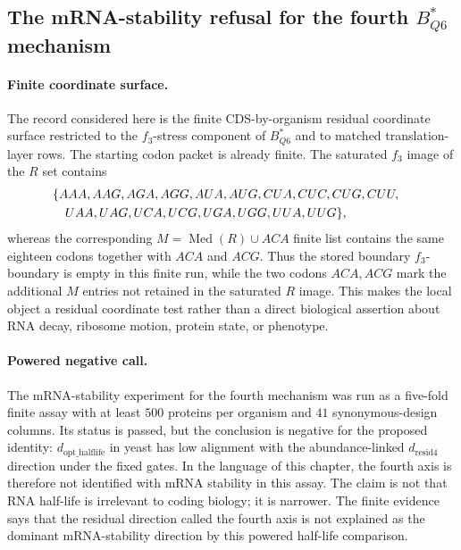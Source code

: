 
\subsection{The mRNA-stability refusal for the fourth $B^{\ast}_{Q6}$ mechanism}
\label{sec:bioreality-q6-fourth-mechanism-mrna-stability-refusal}

\paragraph{Finite coordinate surface.}
The record considered here is the finite CDS-by-organism residual coordinate surface restricted to the $f_3$-stress component of $B^{\ast}_{Q6}$ and to matched translation-layer rows.  The starting codon packet is already finite.  The saturated $f_3$ image of the $R$ set contains
$$
\begin{aligned}
&\{AAA,AAG,AGA,AGG,AUA,AUG,CUA,CUC,CUG,CUU,\cr
&\quad UAA,UAG,UCA,UCG,UGA,UGG,UUA,UUG\},
\end{aligned}
$$
whereas the corresponding $M=\operatorname{Med}(R)\cup ACA$ finite list contains the same eighteen codons together with $ACA$ and $ACG$.  Thus the stored boundary $f_3$-boundary is empty in this finite run, while the two codons $ACA,ACG$ mark the additional $M$ entries not retained in the saturated $R$ image.  This makes the local object a residual coordinate test rather than a direct biological assertion about RNA decay, ribosome motion, protein state, or phenotype.

\paragraph{Powered negative call.}
The mRNA-stability experiment for the fourth mechanism was run as a five-fold finite assay with at least $500$ proteins per organism and $41$ synonymous-design columns.  Its status is passed, but the conclusion is negative for the proposed identity: $d_{\mathrm{opt\_halflife}}$ in yeast has low alignment with the abundance-linked $d_{\mathrm{resid4}}$ direction under the fixed gates.  In the language of this chapter, the fourth axis is therefore not identified with mRNA stability in this assay.  The claim is not that RNA half-life is irrelevant to coding biology; it is narrower.  The finite evidence says that the residual direction called the fourth axis is not explained as the dominant mRNA-stability direction by this powered half-life comparison.

